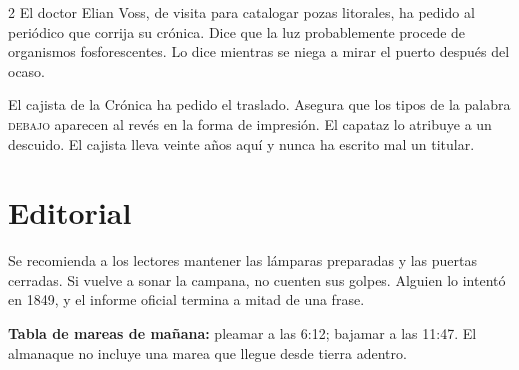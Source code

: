 \begin{multicols}{2}
El doctor Elian Voss, de visita para catalogar pozas litorales, ha pedido al
periódico que corrija su crónica. Dice que la luz probablemente procede de
organismos fosforescentes. Lo dice mientras se niega a mirar el puerto
después del ocaso.

El cajista de la Crónica ha pedido el traslado. Asegura que los tipos de la
palabra \textsc{debajo} aparecen al revés en la forma de impresión. El
capataz lo atribuye a un descuido. El cajista lleva veinte años aquí y nunca
ha escrito mal un titular.

\section*{Editorial}
Se recomienda a los lectores mantener las lámparas preparadas y las puertas
cerradas. Si vuelve a sonar la campana, no cuenten sus golpes. Alguien lo
intentó en 1849, y el informe oficial termina a mitad de una frase.

\textbf{Tabla de mareas de mañana:} pleamar a las 6:12; bajamar a las 11:47.
El almanaque no incluye una marea que llegue desde tierra adentro.
\end{multicols}
